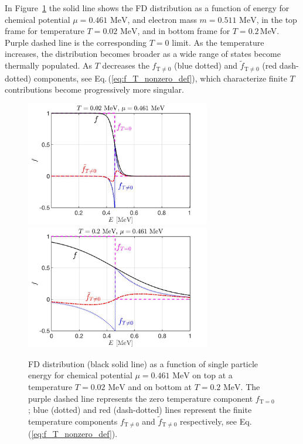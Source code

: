 \documentclass[sn-mathphys,Numbered]{sn-jnl}
\newcommand{\req}[1]{Eq.\,(\ref{#1})}
\newcommand{\rf}[1]{Figure~{\ref{#1}}}
\newcommand*{\MeV}{\text{ MeV}}
\begin{document}
In \rf{Fermi_Component} the solid line shows the FD distribution as a function of energy for chemical potential $\mu=0.461\MeV$, and electron mass $m=0.511\MeV$, in the top frame for temperature $T=0.02\MeV$, and in bottom frame for $T=0.2$\,MeV. Purple dashed line is the corresponding $T=0$ limit. As the temperature increases, the distribution becomes broader as a wide range of states become thermally populated. As $T$ decreases the $f_\mathrm{T\neq0}$ (blue dotted) and $\widetilde f_\mathrm{T\neq0}$ (red dash-dotted) components, see \req{eq:f_T_nonzero_def}, which characterize finite $T$ contributions become progressively more singular.
 

\begin{figure}%
\centering
\includegraphics[width=0.72\textwidth]{./plot/FermiZeorFiniteTemperature}\\
\includegraphics[width=0.72\textwidth]{./plot/FermiZeroFiniteTemperature002}
\caption{
FD distribution (black solid line) as a function of single particle energy for chemical potential $\mu=0.461\MeV$ on top at a temperature $T=0.02\MeV$ and on bottom at $T=0.2\MeV$. The purple dashed line represents the zero temperature component $f_{\mathrm{T}=0}$; blue (dotted) and red (dash-dotted) lines represent the finite temperature components $f_\mathrm{T\neq0}$ and $\widetilde f_\mathrm{T\neq0}$ respectively, see \req{eq:f_T_nonzero_def}.
}
\label{Fermi_Component}
\end{figure}
\end{document}
